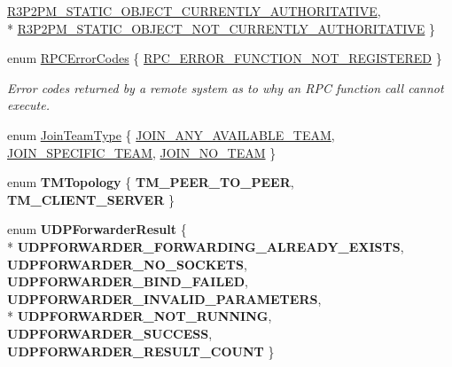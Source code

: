 \begin{DoxyCompactItemize}
\hyperlink{group___r_e_p_l_i_c_a___m_a_n_a_g_e_r___g_r_o_u_p3_gga91a588da9d58bc86b8fb7e4f27ddcf7ead8f368971bbf8939507a5f0550e1af04}{R3\-P2\-P\-M\-\_\-\-S\-T\-A\-T\-I\-C\-\_\-\-O\-B\-J\-E\-C\-T\-\_\-\-C\-U\-R\-R\-E\-N\-T\-L\-Y\-\_\-\-A\-U\-T\-H\-O\-R\-I\-T\-A\-T\-I\-V\-E}, 
\\*
\hyperlink{group___r_e_p_l_i_c_a___m_a_n_a_g_e_r___g_r_o_u_p3_gga91a588da9d58bc86b8fb7e4f27ddcf7ea3b8743fa18228e729bcad3e2a89c7752}{R3\-P2\-P\-M\-\_\-\-S\-T\-A\-T\-I\-C\-\_\-\-O\-B\-J\-E\-C\-T\-\_\-\-N\-O\-T\-\_\-\-C\-U\-R\-R\-E\-N\-T\-L\-Y\-\_\-\-A\-U\-T\-H\-O\-R\-I\-T\-A\-T\-I\-V\-E}
 \}
\item 
enum \hyperlink{group___r_p_c___p_l_u_g_i_n___g_r_o_u_p_gac20c52e6dc585406689d52db29925bba}{R\-P\-C\-Error\-Codes} \{ \hyperlink{group___r_p_c___p_l_u_g_i_n___g_r_o_u_p_ggac20c52e6dc585406689d52db29925bbaa832e0495ea50b9a373d201a3e28f086b}{R\-P\-C\-\_\-\-E\-R\-R\-O\-R\-\_\-\-F\-U\-N\-C\-T\-I\-O\-N\-\_\-\-N\-O\-T\-\_\-\-R\-E\-G\-I\-S\-T\-E\-R\-E\-D}
 \}
\begin{DoxyCompactList}\small\item\em Error codes returned by a remote system as to why an R\-P\-C function call cannot execute. \end{DoxyCompactList}\item 
enum \hyperlink{group___t_e_a_m___m_a_n_a_g_e_r___g_r_o_u_p_ga8a8704b992ae17ee4789b2ba4cc4b34b}{Join\-Team\-Type} \{ \hyperlink{group___t_e_a_m___m_a_n_a_g_e_r___g_r_o_u_p_gga8a8704b992ae17ee4789b2ba4cc4b34ba6edb2bdfc2a37d3db8dd862c92d0b316}{J\-O\-I\-N\-\_\-\-A\-N\-Y\-\_\-\-A\-V\-A\-I\-L\-A\-B\-L\-E\-\_\-\-T\-E\-A\-M}, 
\hyperlink{group___t_e_a_m___m_a_n_a_g_e_r___g_r_o_u_p_gga8a8704b992ae17ee4789b2ba4cc4b34ba4711c36301a77fa9a6f6783487fc451f}{J\-O\-I\-N\-\_\-\-S\-P\-E\-C\-I\-F\-I\-C\-\_\-\-T\-E\-A\-M}, 
\hyperlink{group___t_e_a_m___m_a_n_a_g_e_r___g_r_o_u_p_gga8a8704b992ae17ee4789b2ba4cc4b34bac7bae805f1fae12f6827f644bfd8e292}{J\-O\-I\-N\-\_\-\-N\-O\-\_\-\-T\-E\-A\-M}
 \}
\item 
enum {\bfseries T\-M\-Topology} \{ {\bfseries T\-M\-\_\-\-P\-E\-E\-R\-\_\-\-T\-O\-\_\-\-P\-E\-E\-R}, 
{\bfseries T\-M\-\_\-\-C\-L\-I\-E\-N\-T\-\_\-\-S\-E\-R\-V\-E\-R}
 \}
\item 
enum {\bfseries U\-D\-P\-Forwarder\-Result} \{ \\*
{\bfseries U\-D\-P\-F\-O\-R\-W\-A\-R\-D\-E\-R\-\_\-\-F\-O\-R\-W\-A\-R\-D\-I\-N\-G\-\_\-\-A\-L\-R\-E\-A\-D\-Y\-\_\-\-E\-X\-I\-S\-T\-S}, 
{\bfseries U\-D\-P\-F\-O\-R\-W\-A\-R\-D\-E\-R\-\_\-\-N\-O\-\_\-\-S\-O\-C\-K\-E\-T\-S}, 
{\bfseries U\-D\-P\-F\-O\-R\-W\-A\-R\-D\-E\-R\-\_\-\-B\-I\-N\-D\-\_\-\-F\-A\-I\-L\-E\-D}, 
{\bfseries U\-D\-P\-F\-O\-R\-W\-A\-R\-D\-E\-R\-\_\-\-I\-N\-V\-A\-L\-I\-D\-\_\-\-P\-A\-R\-A\-M\-E\-T\-E\-R\-S}, 
\\*
{\bfseries U\-D\-P\-F\-O\-R\-W\-A\-R\-D\-E\-R\-\_\-\-N\-O\-T\-\_\-\-R\-U\-N\-N\-I\-N\-G}, 
{\bfseries U\-D\-P\-F\-O\-R\-W\-A\-R\-D\-E\-R\-\_\-\-S\-U\-C\-C\-E\-S\-S}, 
{\bfseries U\-D\-P\-F\-O\-R\-W\-A\-R\-D\-E\-R\-\_\-\-R\-E\-S\-U\-L\-T\-\_\-\-C\-O\-U\-N\-T}
 \}
\end{DoxyCompactItemize}
